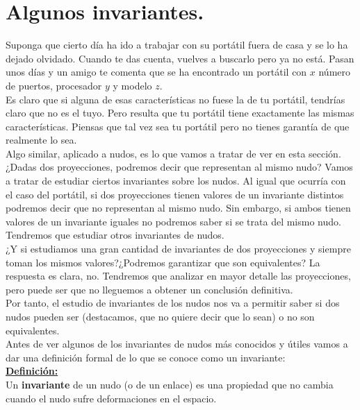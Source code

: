 \section{Algunos invariantes.}\label{seccion5}
Suponga que cierto día ha ido a trabajar con su portátil fuera de casa y se lo ha dejado olvidado. Cuando te das cuenta, vuelves a buscarlo pero ya no está. Pasan unos días y un amigo te comenta que se ha encontrado un portátil con $x$ número de puertos, procesador $y$ y modelo $z$.\\

Es claro que si alguna de esas características no fuese la de tu portátil, tendrías claro que no es el tuyo. Pero resulta que tu portátil tiene exactamente las mismas características. Piensas que tal vez sea tu portátil pero no tienes garantía de que realmente lo sea. \\

Algo similar, aplicado a nudos, es lo que vamos a tratar de ver en esta sección. ¿Dadas dos proyecciones, podremos decir que representan al mismo nudo? Vamos a tratar de estudiar ciertos invariantes sobre los nudos. Al igual que ocurría con el caso del portátil, si dos proyecciones tienen valores de un invariante distintos podremos decir que no representan al mismo nudo. Sin embargo, si ambos tienen valores de un invariante iguales no podremos saber si se trata del mismo nudo. Tendremos que estudiar otros invariantes de nudos. \\

¿Y si estudiamos una gran cantidad de invariantes de dos proyecciones y siempre toman los mismos valores?¿Podremos garantizar que son equivalentes? La respuesta es clara, no. Tendremos que analizar en mayor detalle las proyecciones, pero puede ser que no lleguemos a obtener un conclusión definitiva. \\


Por tanto, el estudio de invariantes de los nudos nos va a permitir saber si dos nudos pueden ser (destacamos, que no quiere decir que lo sean) o no son equivalentes.\\


Antes de ver algunos de los invariantes de nudos más conocidos y útiles vamos a dar una definición formal de lo que se conoce como un invariante:\\

\underline{\textbf{Definición:}} \\
Un \textbf{invariante} de un nudo (o de un enlace) es una propiedad que no cambia cuando el nudo sufre deformaciones en el espacio. \\



